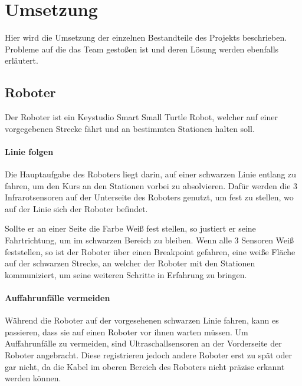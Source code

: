 \chapter{Umsetzung}
Hier wird die Umsetzung der einzelnen Bestandteile des Projekts beschrieben. Probleme auf die das Team gestoßen ist und deren Lösung werden ebenfalls erläutert.

\section{Roboter}
Der Roboter ist ein Keystudio Smart Small Turtle Robot, welcher auf einer vorgegebenen Strecke fährt und an bestimmten Stationen halten soll. 
\subsubsection{Linie folgen}
Die Hauptaufgabe des Roboters liegt darin, auf einer schwarzen Linie entlang zu fahren, um den Kurs an den Stationen vorbei zu absolvieren. Dafür werden die 3 Infrarotsensoren auf der Unterseite des Roboters genutzt, um fest zu stellen, wo auf der Linie sich der Roboter befindet.

Sollte er an einer Seite die Farbe Weiß fest stellen, so justiert er seine Fahrtrichtung, um im schwarzen Bereich zu bleiben. Wenn alle 3 Sensoren Weiß feststellen, so ist der Roboter über einen Breakpoint gefahren, eine weiße Fläche auf der schwarzen Strecke, an welcher der Roboter mit den Stationen kommuniziert, um seine weiteren Schritte in Erfahrung zu bringen.

\subsubsection{Auffahrunfälle vermeiden}
Während die Roboter auf der vorgesehenen schwarzen Linie fahren, kann es passieren, dass sie auf einen Roboter vor ihnen warten müssen. Um Auffahrunfälle zu vermeiden, sind Ultraschallsensoren an der Vorderseite der Roboter angebracht. Diese registrieren jedoch andere Roboter erst zu spät oder gar nicht, da die Kabel im oberen Bereich des Roboters nicht präzise erkannt werden können.

